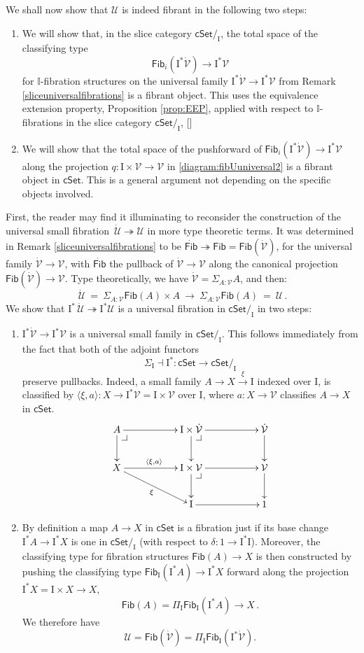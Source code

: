 \documentclass[12pt]{article}
\makeatletter
\newcommand{\ednote}[1]{[\textit{\color{red}{#1}}]} %
\newcommand{\cSet}{\ensuremath{\mathsf{cSet}}}
\newcommand{\fib}{\ensuremath{\twoheadrightarrow}}
\renewcommand{\to}{\ensuremath{\rightarrow}}
\newcommand{\too}{\ensuremath{\longrightarrow}}
\newcommand{\I}{\ensuremath{\mathrm{I}}}
\newcommand{\II}{\ensuremath{\mathbb{I}}}
\newcommand{\U}{\ensuremath{\mathcal{U}}}
\newcommand{\UU}{\ensuremath{\,\dot{\mathcal{U}}}}
\newcommand{\V}{\ensuremath{\mathcal{V}}}
\newcommand{\VV}{\ensuremath{\dot{\mathcal{V}}}}
\newcommand{\Fib}{\ensuremath{\mathsf{Fib}}}
\newcommand{\FFib}{\ensuremath{\dot{\mathsf{Fib}}}}
\theoremstyle{remark}
\theoremstyle{definition}
\newcommand{\pbcorner}[1][dr]{\save*!/#1-1.2pc/#1:(-1,1)@^{|-}\restore}
\makeatother
\begin{document}
We shall now show that $\U$ is indeed fibrant in the following two steps: 
\begin{enumerate}
\item We will show that, in the slice category $\cSet/_\I$, the total space of the classifying type $$\Fib_i(\I^*\VV) \to \I^*\V$$ for $\II$-fibration structures on the universal family $\I^*\VV \to \I^*\V$ from Remark \ref{sliceuniversalfibrations} is a fibrant object. This uses the equivalence extension property, Proposition \ref{prop:EEP}, applied with respect to $\II$-fibrations in the slice category $\cSet/_\I$, \ednote{as justified by ...}  

\item We will show that the total space of the pushforward of $\Fib_i(\I^*\VV) \to \I^*\V$ along the projection $q : \I\times\V\to\V$ in \eqref{diagram:fibUuniversal2} is a fibrant object in $\cSet$.  This is a general argument not depending on the specific objects involved.
\end{enumerate}

First, the reader may find it illuminating to reconsider the construction of the universal small fibration $\UU \fib \U$ in more type theoretic terms.  It was determined in Remark \ref{sliceuniversalfibrations} to be $\FFib\fib\Fib = \Fib(\VV)$, for the universal family $\VV \to \V$, with $\FFib$ the pullback of $\VV \to \V$ along the canonical projection $\Fib(\VV)\to\V$. Type theoretically, we have $\VV = \Sigma_{A:\V}A$, and then:
\[
\UU\ =\ \Sigma_{A:\V}\Fib(A)\times A\ \too\ \Sigma_{A:\V}\Fib(A)\ =\ \U \,.
\]
We show that $\I^*\UU\fib\I^*\U$ is a universal fibration in $\cSet/_\I$ in two steps:
\begin{enumerate}
\item $\I^*\VV\to\I^*\V$ is a universal small family in $\cSet/_\I$.  This follows immediately from the fact that both of the adjoint functors 
\[
\Sigma_\I \dashv \I^* : \cSet \to \cSet/_\I
\]
preserve pullbacks.  Indeed, a small family $A\to X \stackrel{\xi}{\to} \I$ indexed over $\I$, is classified by $\langle \xi,a \rangle : X \to \I^*\V = \I\times\V$ over $\I$, where $a : X \to \V$ classifies $A\to X$ in $\cSet$.
\[
\xymatrix{
A \ar[d] \ar[rr] 	\pbcorner && \I\times\VV \ar[d] \ar[rr] \pbcorner 	&& \VV \ar[d] \\
X  \ar[rrd]_\xi \ar[rr]^{\langle \xi,a \rangle}  && \I\times\V \ar[d] \ar[rr] \pbcorner&& \V \ar[d]  \\
			&& \I \ar[rr] &&  1
}
\]
\item By definition a map $A\to X$ in $\cSet$ is a fibration just if its base change $\I^*A \to \I^*X$ is one in $\cSet/_\I$  (with respect to $\delta : 1 \to \I^*\I$).  Moreover, the classifying type for fibration structures $\Fib(A) \to X$ is then constructed by pushing the classifying type $\Fib_\I(\I^*A) \to \I^*X$ forward along the projection  $\I^*X = \I\times X\to X$,
\[
\Fib(A) = \Pi_\I \Fib_\I(\I^*A)\to X\,.
\]
We therefore have 
\[
\U = \Fib(\VV) = \Pi_\I \Fib_\I(\I^*\VV).
\]
\end{enumerate}
\end{document}
